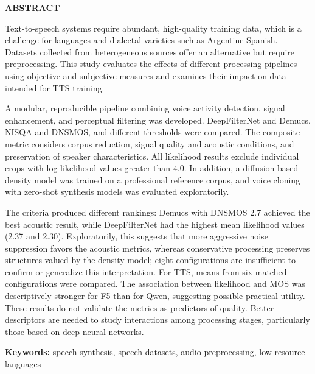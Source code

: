 \begin{centering}
\Large{\textbf{ABSTRACT}}

\end{centering}

Text-to-speech systems require abundant, high-quality training data, which is a challenge for languages and dialectal varieties such as Argentine Spanish. Datasets collected from heterogeneous sources offer an alternative but require preprocessing. This study evaluates the effects of different processing pipelines using objective and subjective measures and examines their impact on data intended for TTS training.

A modular, reproducible pipeline combining voice activity detection, signal enhancement, and perceptual filtering was developed. DeepFilterNet and Demucs, NISQA and DNSMOS, and different thresholds were compared. The composite metric considers corpus reduction, signal quality and acoustic conditions, and preservation of speaker characteristics. All likelihood results exclude individual crops with log-likelihood values greater than 4.0. In addition, a diffusion-based density model was trained on a professional reference corpus, and voice cloning with zero-shot synthesis models was evaluated exploratorily.

The criteria produced different rankings: Demucs with DNSMOS 2.7 achieved the best acoustic result, while DeepFilterNet had the highest mean likelihood values (2.37 and 2.30). Exploratorily, this suggests that more aggressive noise suppression favors the acoustic metrics, whereas conservative processing preserves structures valued by the density model; eight configurations are insufficient to confirm or generalize this interpretation. For TTS, means from six matched configurations were compared. The association between likelihood and MOS was descriptively stronger for F5 than for Qwen, suggesting possible practical utility. These results do not validate the metrics as predictors of quality. Better descriptors are needed to study interactions among processing stages, particularly those based on deep neural networks.

\noindent\textbf{Keywords:} speech synthesis, speech datasets, audio preprocessing, low-resource languages
